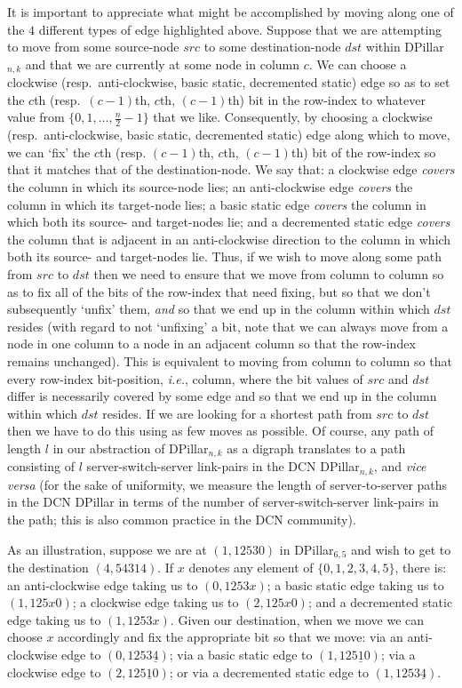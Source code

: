 \documentclass{article}
\begin{document}
It is important to appreciate what might be accomplished by moving along one of
the $4$ different types of edge highlighted above. Suppose that we are
attempting to move from some source-node $src$ to some destination-node $dst$
within DPillar$_{n,k}$ and that we are currently at some node in column $c$. We
can choose a clockwise (resp.\ anti-clockwise, basic static, decremented static)
edge so as to set the $c$th (resp.\ $(c-1)$th, $c$th, $(c-1)$th) bit in the
row-index to whatever value from $\{0,1,\ldots,\frac{n}{2}-1\}$ that we like.
Consequently, by choosing a clockwise (resp.\ anti-clockwise, basic static,
decremented static) edge along which to move, we can `fix' the $c$th (resp.
$(c-1)$th, $c$th, $(c-1)$th) bit of the row-index so that it matches that of the
destination-node. We say that: a clockwise edge \emph{covers\/} the column in
which its source-node lies; an anti-clockwise edge \emph{covers\/} the column in
which its target-node lies; a basic static edge \emph{covers\/} the column in
which both its source- and target-nodes lie; and a decremented static edge
\emph{covers\/} the column that is adjacent in an anti-clockwise direction to
the column in which both its source- and target-nodes lie. Thus, if we wish to
move along some path from $src$ to $dst$ then we need to ensure that we move
from column to column so as to fix all of the bits of the row-index that need
fixing, but so that we don't subsequently `unfix' them, \emph{and\/} so that we
end up in the column within which $dst$ resides (with regard to not `unfixing' a
bit, note that we can always move from a node in one column to a node in an
adjacent column so that the row-index remains unchanged). This is equivalent to
moving from column to column so that every row-index bit-position, \emph{i.e.},
column, where the bit values of $src$ and $dst$ differ is necessarily covered by
some edge and so that we end up in the column within which $dst$ resides. If we
are looking for a shortest path from $src$ to $dst$ then we have to do this
using as few moves as possible. Of course, any path of length $l$ in our
abstraction of DPillar$_{n,k}$ as a digraph translates to a path consisting of
$l$ server-switch-server link-pairs in the DCN DPillar$_{n,k}$, and \emph{vice
  versa\/} (for the sake of uniformity, we measure the length of
server-to-server paths in the DCN DPillar in terms of the number of
server-switch-server link-pairs in the path; this is also common practice in the
DCN community).

As an illustration, suppose we are at $(1,12530)$ in DPillar$_{6,5}$ and wish to get to the destination $(4,54314)$. If $x$ denotes any element of $\{0,1,2,3,4,5\}$, there is: an anti-clockwise edge taking us to $(0,1253x)$; a basic static edge taking us to $(1,125x0)$; a clockwise edge taking us to $(2,125x0)$; and a decremented static edge taking us to $(1,1253x)$. Given our destination, when we move we can choose $x$ accordingly and fix the appropriate bit so that we move: via an anti-clockwise edge to $(0,1253\underline{4})$; via a basic static edge to $(1,125\underline{1} 0)$; via a clockwise edge to $(2,125\underline{1}0)$; or via a decremented static edge to $(1,1253\underline{4} )$.
\end{document}
